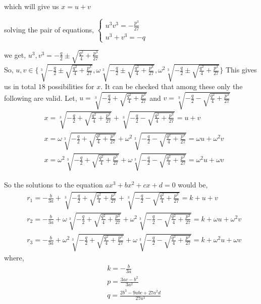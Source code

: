 \documentclass[a4paper,12pt,abstracton]{scrartcl}
\theoremstyle{dotlessP}
\theoremstyle{dotlessS}
\theoremstyle{remark}
\theoremstyle{definition}
\begin{document}
which will give us $x=u+v$

solving the pair of equations,
$\begin{cases}
u^3v^3=-\frac{p^3}{27}\\
u^3+v^3=-q
\end{cases}$

we get, $u^3,v^3=-\frac{q}{2}\pm\sqrt{\frac{q^2}{4}+\frac{p^3}{27}}$\\
So, $u,v\in\bigg\{\sqrt[3]{-\frac{q}{2}\pm\sqrt{\frac{q^2}{4}+\frac{p^3}{27}}},\omega\sqrt[3]{-\frac{q}{2}\pm\sqrt{\frac{q^2}{4}+\frac{p^3}{27}}},\omega^2\sqrt[3]{-\frac{q}{2}\pm\sqrt{\frac{q^2}{4}+\frac{p^3}{27}}}\bigg\}$
This gives us in total $18$ possibilities for $x$. It can be checked that among these only the following are valid. Let, $u=\sqrt[3]{-\frac{q}{2}+\sqrt{\frac{q^2}{4}+\frac{p^3}{27}}}$ and $v=\sqrt[3]{-\frac{q}{2}-\sqrt{\frac{q^2}{4}+\frac{p^3}{27}}}$
\begin{align*}
&x=\sqrt[3]{-\frac{q}{2}+\sqrt{\frac{q^2}{4}+\frac{p^3}{27}}}+\sqrt[3]{-\frac{q}{2}-\sqrt{\frac{q^2}{4}+\frac{p^3}{27}}}=u+v\\
&x=\omega\sqrt[3]{-\frac{q}{2}+\sqrt{\frac{q^2}{4}+\frac{p^3}{27}}}+\omega^2\sqrt[3]{-\frac{q}{2}-\sqrt{\frac{q^2}{4}+\frac{p^3}{27}}}=\omega u+\omega^2 v\\
&x=\omega^2\sqrt[3]{-\frac{q}{2}+\sqrt{\frac{q^2}{4}+\frac{p^3}{27}}}+\omega\sqrt[3]{-\frac{q}{2}-\sqrt{\frac{q^2}{4}+\frac{p^3}{27}}}=\omega^2 u+\omega v
\end{align*}

So the solutions to the equation $ax^3+bx^2+cx+d=0$ would be,
\begin{align*}
&r_1=-\frac{b}{3a}+\sqrt[3]{-\frac{q}{2}+\sqrt{\frac{q^2}{4}+\frac{p^3}{27}}}+\sqrt[3]{-\frac{q}{2}-\sqrt{\frac{q^2}{4}+\frac{p^3}{27}}}=k+u+v\\
&r_2=-\frac{b}{3a}+\omega\sqrt[3]{-\frac{q}{2}+\sqrt{\frac{q^2}{4}+\frac{p^3}{27}}}+\omega^2\sqrt[3]{-\frac{q}{2}-\sqrt{\frac{q^2}{4}+\frac{p^3}{27}}}=k+\omega u+\omega^2 v\\
&r_3=-\frac{b}{3a}+\omega^2\sqrt[3]{-\frac{q}{2}+\sqrt{\frac{q^2}{4}+\frac{p^3}{27}}}+\omega\sqrt[3]{-\frac{q}{2}-\sqrt{\frac{q^2}{4}+\frac{p^3}{27}}}=k+\omega^2 u+\omega v
\end{align*}
where,
\begin{align*}
&k=-\frac{b}{3a}\\
&p=\frac{3ac-b^2}{3a^2}\\
&q=\frac{2b^3-9abc+27a^2d}{27a^3}
\end{align*} 
\end{document}
